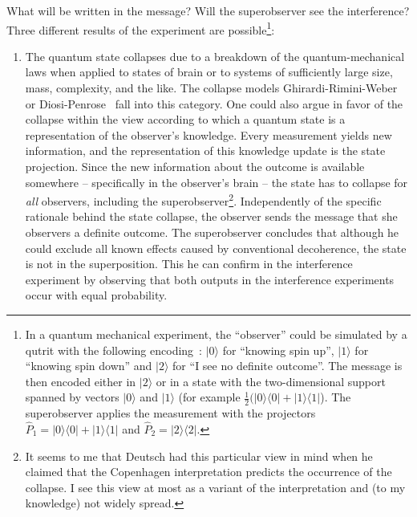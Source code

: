 \documentclass[12pt,a4]{article}
\begin{document}
What will be written in the message? Will the superobserver see the interference? Three different results of the experiment are possible\footnote{In a quantum mechanical experiment, the ``observer'' could be simulated by a qutrit with the following encoding~\cite{bennett}: $|0\rangle$ for ``knowing spin up'', $|1\rangle$ for ``knowing spin down'' and $|2\rangle$ for ``I see no definite outcome''. The message is then encoded either in $|2\rangle$ or in a state with the two-dimensional support spanned by vectors $|0\rangle$ and $|1\rangle$ (for example $\frac{1}{2}(|0\rangle\langle 0|+|1\rangle \langle 1|$). The superobserver applies the measurement with the projectors $\hat{P}_1=|0\rangle \langle 0| + |1\rangle \langle 1|$ and $\hat{P}_2=|2\rangle \langle 2|$.}:

\begin{enumerate}

\item The quantum state collapses due to a breakdown of the quantum-mechanical laws when applied to states of brain or to systems of sufficiently large size, mass, complexity, and the like. The collapse models Ghirardi-Rimini-Weber~\cite{GRW} or Diosi-Penrose~\cite{diosi,penrose} fall into this category. One could also argue in favor of the collapse within the view according to which a quantum state is a representation of the observer's knowledge. Every measurement yields new information, and the representation of this knowledge update is the state projection. Since the new information about the outcome is available somewhere -- specifically in the observer's brain -- the state has to collapse for {\it all} observers, including the superobserver\footnote{It seems to me that Deutsch had this particular view in mind when he claimed that the Copenhagen interpretation predicts the occurrence of the collapse. I see this view at most as a variant of the interpretation and (to my knowledge) not widely spread.}. Independently of the specific rationale behind the state collapse, the observer sends the message that she observers a definite outcome. The superobserver concludes that although he could exclude all known effects caused by conventional decoherence, the state is not in the superposition. This he can confirm in the interference experiment by observing that both outputs in the interference experiments occur with equal probability.  


\end{enumerate}
\end{document}
